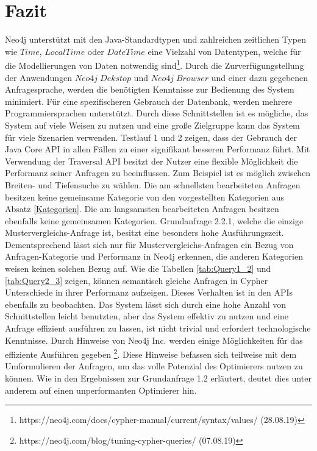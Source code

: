 \section{Fazit}
Neo4j unterstützt mit den Java-Standardtypen und zahlreichen zeitlichen Typen wie $Time$, $LocalTime$ oder $DateTime$ eine Vielzahl von Datentypen, welche für die Modellierungen von Daten notwendig sind\footnote{https://neo4j.com/docs/cypher-manual/current/syntax/values/ (28.08.19)}. Durch die Zurverfügungstellung der Anwendungen $Neo4j\; Dekstop$ und $Neo4j\; Browser$ und einer dazu gegebenen Anfragesprache, werden die benötigten Kenntnisse zur Bedienung des System minimiert. Für eine spezifischeren Gebrauch der Datenbank, werden mehrere Programmiersprachen unterstützt. Durch diese Schnittstellen ist es mögliche, das System auf viele Weisen zu nutzen und eine große Zielgruppe kann das System für viele Szenarien verwenden. \newline 
Testlauf 1 und 2 zeigen, dass der Gebrauch der Java Core API in allen Fällen zu einer signifikant besseren Performanz führt. Mit Verwendung der Traversal API besitzt der Nutzer eine flexible Möglichkeit die Performanz seiner Anfragen zu beeinflussen. Zum Beispiel ist es möglich zwischen Breiten- und Tiefensuche zu wählen. Die am schnellsten bearbeiteten Anfragen besitzen keine gemeinsame Kategorie von den vorgestellten Kategorien aus Absatz \ref{Kategorien}. Die am langsamsten bearbeiteten Anfragen besitzen ebenfalls keine gemeinsamen Kategorien. Grundanfrage 2.2.1, welche die einzige Mustervergleichs-Anfrage ist, besitzt eine besonders hohe Ausführungszeit. Dementsprechend lässt sich nur für Mustervergleichs-Anfragen ein Bezug von Anfragen-Kategorie und Performanz in Neo4j erkennen, die anderen Kategorien weisen keinen solchen Bezug auf. \newline
Wie die Tabellen \ref{tab:Query1_2} und \ref{tab:Query2_3} zeigen, können semantisch gleiche Anfragen in Cypher Unterschiede in ihrer Performanz aufzeigen. Dieses Verhalten ist in den APIs ebenfalls zu beobachten. Das System lässt sich durch eine hohe Anzahl von Schnittstellen leicht benutzten, aber das System effektiv zu nutzen und eine Anfrage effizient ausführen zu lassen, ist nicht trivial und erfordert technologische Kenntnisse. Durch Hinweise von Neo4j Inc. werden einige Möglichkeiten für das effiziente Ausführen gegeben \footnote{https://neo4j.com/blog/tuning-cypher-queries/ (07.08.19)}. Diese Hinweise befassen sich teilweise mit dem Umformulieren der Anfragen, um das volle Potenzial des Optimierers nutzen zu können. Wie in den Ergebnissen zur Grundanfrage 1.2 erläutert, deutet dies unter anderem auf einen unperformanten Optimierer hin. \newline
